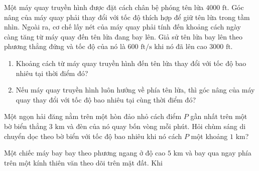 \begin{minipage}[t]{0.48\textwidth}
\begin{exerciselist}[start=41]
  \item Một máy quay truyền hình được đặt cách chân bệ phóng tên lửa $4000\text{ ft}$. Góc nâng của máy quay phải thay đổi với tốc độ thích hợp để giữ tên lửa trong tầm nhìn. Ngoài ra, cơ chế lấy nét của máy quay phải tính đến khoảng cách ngày càng tăng từ máy quay đến tên lửa đang bay lên. Giả sử tên lửa bay lên theo phương thẳng đứng và tốc độ của nó là $600\text{ ft/s}$ khi nó đã lên cao $3000\text{ ft}$.
  \begin{enumerate}[label=\textbf{(\alph*)}, leftmargin=1.5em, itemsep=2pt, topsep=2pt]
    \item Khoảng cách từ máy quay truyền hình đến tên lửa thay đổi với tốc độ bao nhiêu tại thời điểm đó?
    \item Nếu máy quay truyền hình luôn hướng về phía tên lửa, thì góc nâng của máy quay thay đổi với tốc độ bao nhiêu tại cùng thời điểm đó?
  \end{enumerate}

  \item Một ngọn hải đăng nằm trên một hòn đảo nhỏ cách điểm $P$ gần nhất trên một bờ biển thẳng $3\text{ km}$ và đèn của nó quay bốn vòng mỗi phút. Hỏi chùm sáng di chuyển dọc theo bờ biển với tốc độ bao nhiêu khi nó cách $P$ một khoảng $1\text{ km}$?

  \item Một chiếc máy bay bay theo phương ngang ở độ cao $5\text{ km}$ và bay qua ngay phía trên một kính thiên văn theo dõi trên mặt đất. Khi
\end{exerciselist}
\end{minipage}
